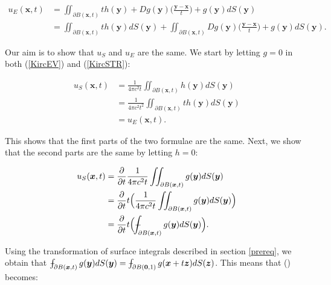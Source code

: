 \documentclass[a4paper, 12pt]{article}
\def\Xint#1{\mathchoice
{\XXint\displaystyle\textstyle{#1}}%
{\XXint\textstyle\scriptstyle{#1}}%
{\XXint\scriptstyle\scriptscriptstyle{#1}}%
{\XXint\scriptscriptstyle\scriptscriptstyle{#1}}%
\!\int}
\def\XXint#1#2#3{{\setbox0=\hbox{$#1{#2#3}{\int}$ }
\vcenter{\hbox{$#2#3$ }}\kern-.6\wd0}}
\def\dashint{\Xint-}
\numberwithin{equation}{section}
\begin{document}
\begin{equation*}
    \begin{aligned}
    u_E(\boldsymbol{x},t)&=\iint_{\partial B(\boldsymbol{x},t)} th(\boldsymbol{y})+Dg(\boldsymbol{y})\Big(\frac{\boldsymbol{y}-\boldsymbol{x}}{t}\Big)+g(\boldsymbol{y})dS(\boldsymbol{y})\\ 
    &=\iint_{\partial B(\boldsymbol{x},t)} th(\boldsymbol{y})dS(\boldsymbol{y})+\iint_{\partial B(\boldsymbol{x},t)} Dg(\boldsymbol{y})\Big(\frac{\boldsymbol{y}-\boldsymbol{x}}{t}\Big)+g(\boldsymbol{y})dS(\boldsymbol{y}).
    \end{aligned}
\end{equation*}

Our aim is to show that $u_S$ and $u_E$ are the same. We start by letting $g=0$ in both (\ref{KircEV}) and (\ref{KircSTR}):

\begin{equation} \label{g=0}
    \begin{aligned}
        u_S(\boldsymbol{x}, t)&=\frac{1}{4\pi c^2 t}\iint_{\partial B(\boldsymbol{x}, t)}h(\boldsymbol{y})dS(\boldsymbol{y})\\
        &=\frac{1}{4\pi c^2 t^2}\iint_{\partial B(\boldsymbol{x}, t)}th(\boldsymbol{y})dS(\boldsymbol{y})\\
        &=u_E(\boldsymbol{x}, t).
    \end{aligned}
\end{equation}

This shows that the first parts of the two formulae are the same. Next, we show that the second parts are the same by letting $h=0$:

\begin{equation} \label{starr}
    \begin{aligned}
        u_S(\boldsymbol{x},t)&=\diffp[1]{}{t}\frac{1}{4\pi c^2 t}\iint_{\partial B(\boldsymbol{x}, t)}g(\boldsymbol{y})dS(\boldsymbol{y})\\
        &=\diffp[1]{}{t}t\Big(\frac{1}{4\pi c^2 t}\iint_{\partial B(\boldsymbol{x}, t)}g(\boldsymbol{y})dS(\boldsymbol{y})\Big)\\
        &=\diffp[1]{}{t}t\Big(\dashint_{\partial B(\boldsymbol{x}, t)}g(\boldsymbol{y})dS(\boldsymbol{y})\Big).
    \end{aligned}
\end{equation}

Using the transformation of surface integrals described in section \ref{prereq}, we obtain that $\dashint_{\partial B(\boldsymbol{x}, t)}g(\boldsymbol{y})dS(\boldsymbol{y})=\dashint_{\partial B(\boldsymbol{0}, 1)}g(\boldsymbol{x}+t\boldsymbol{z})dS(\boldsymbol{z})$. 
This means that (\label{starr}) becomes:
\end{document}
